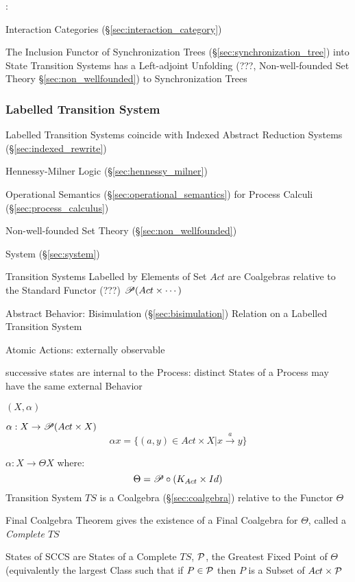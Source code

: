 \cite{abramsky-gay-nagarajan96}:

Interaction Categories (\S\ref{sec:interaction_category})

The Inclusion Functor of Synchronization Trees
(\S\ref{sec:synchronization_tree}) into State Transition Systems has a
Left-adjoint Unfolding (???, Non-well-founded Set Theory
\S\ref{sec:non_wellfounded}) to Synchronization Trees



\subsubsection{Labelled Transition System}
\label{sec:labelled_transition}

Labelled Transition Systems coincide with Indexed Abstract Reduction
Systems (\S\ref{sec:indexed_rewrite})

Hennessy-Milner Logic (\S\ref{sec:hennessy_milner})


Operational Semantics (\S\ref{sec:operational_semantics}) for Process
Calculi (\S\ref{sec:process_calculus})

Non-well-founded Set Theory (\S\ref{sec:non_wellfounded})

System (\S\ref{sec:system})

Transition Systems Labelled by Elements of Set $Act$ are Coalgebras
relative to the Standard Functor (???) $\mathscr{P}(Act \times \cdots)$
\cite{aczel88}

Abstract Behavior: Bisimulation (\S\ref{sec:bisimulation}) Relation on
a Labelled Transition System \cite{aczel88}

Atomic Actions: externally observable

successive states are internal to the Process: distinct States of a
Process may have the same external Behavior \cite{aczel88}

$(X,\alpha)$

$\alpha : X \rightarrow \mathscr{P}(Act \times X)$
\[
  \alpha x = \{(a,y) \in Act \times X | x \xrightarrow{a} y\}
\]

$\alpha : X \rightarrow \Theta X$ where:
\[
  \Theta = \mathscr{P} \circ (K_{Act} \times Id)
\]
Transition System $TS$ is a Coalgebra (\S\ref{sec:coalgebra}) relative
to the Functor $\Theta$

Final Coalgebra Theorem gives the existence of a Final Coalgebra for
$\Theta$, called a \emph{Complete $TS$}

States of SCCS are States of a Complete $TS$, $\mathcal{P}$, the
Greatest Fixed Point of $\Theta$ (equivalently the largest Class such
that if $P \in \mathcal{P}$ then $P$ is a Subset of $Act \times
\mathcal{P}$

